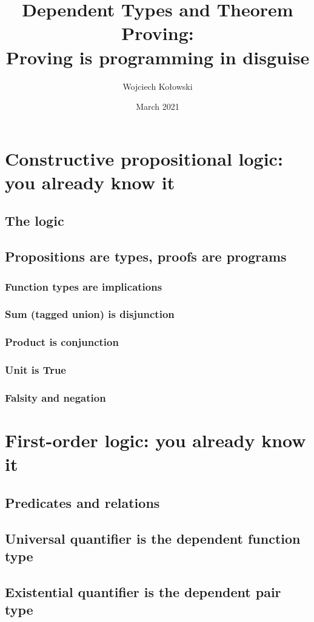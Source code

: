 \documentclass{beamer}
\title{Dependent Types and Theorem Proving: \\Proving is programming in disguise}
\author{Wojciech Kołowski}
\date{March 2021}
\begin{document}
\frame{\titlepage}
\frame{\tableofcontents}

\section{Constructive propositional logic: you already know it}
\subsection{The logic}
\subsection{Propositions are types, proofs are programs}
\subsubsection{Function types are implications}
\subsubsection{Sum (tagged union) is disjunction}
\subsubsection{Product is conjunction}
\subsubsection{Unit is True}
\subsubsection{Falsity and negation}

\section{First-order logic: you already know it}
\subsection{Predicates and relations}
\subsection{Universal quantifier is the dependent function type}
\subsection{Existential quantifier is the dependent pair type}
\end{document}
